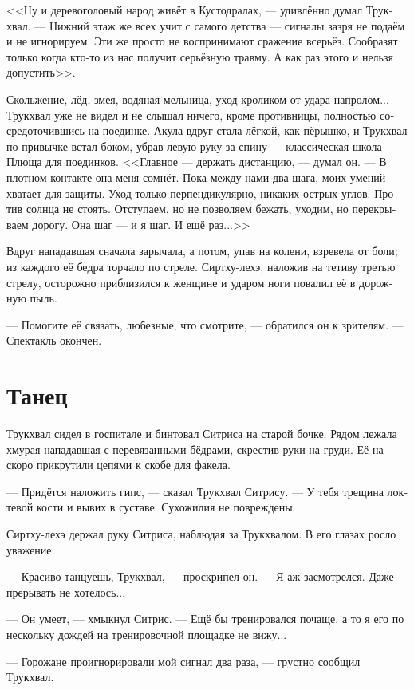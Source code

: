 \documentclass[a4paper,12pt,fleqn]{book}\usepackage{cooltooltips}\usepackage{polyglossia}\setdefaultlanguage{russian}\setotherlanguage{english}\defaultfontfeatures{Ligatures=TeX,Mapping=tex-text} \usepackage{xcolor}\definecolor{lightgray}{HTML}{bbbbbb}\color{lightgray}\newcommand{\ml}[3]{\textenglish{\textcolor{black}{#3}}}
\begin{document}
<<Ну и деревоголовый народ живёт в Кустодралах, --- удивлённо думал Трукхвал.
--- Нижний этаж же всех учит с самого детства --- сигналы зазря не подаём и не игнорируем.
Эти же просто не воспринимают сражение всерьёз.
Сообразят только когда кто-то из нас получит серьёзную травму.
А как раз этого и нельзя допустить>>.

Скольжение, лёд, змея, водяная мельница, уход кроликом от удара напролом...
Трукхвал уже не видел и не слышал ничего, кроме противницы, полностью сосредоточившись на поединке.
Акула вдруг стала лёгкой, как пёрышко, и Трукхвал по привычке встал боком, убрав левую руку за спину --- классическая школа Плюща для поединков.
<<Главное --- держать дистанцию, --- думал он.
--- В плотном контакте она меня сомнёт.
Пока между нами два шага, моих умений хватает для защиты.
Уход только перпендикулярно, никаких острых углов.
Против солнца не стоять.
Отступаем, но не позволяем бежать, уходим, но перекрываем дорогу.
Она шаг --- и я шаг.
И ещё раз...>>

Вдруг нападавшая сначала зарычала, а потом, упав на колени, взревела от боли;
из каждого её бедра торчало по стреле.
Сиртху-лехэ, наложив на тетиву третью стрелу, осторожно приблизился к женщине и ударом ноги повалил её в дорожную пыль.

--- Помогите её связать, любезные, что смотрите, --- обратился он к зрителям.
--- Спектакль окончен.

\section{Танец}

Трукхвал сидел в госпитале и бинтовал Ситриса на старой бочке.
Рядом лежала хмурая нападавшая с перевязанными бёдрами, скрестив руки на груди.
Её наскоро прикрутили цепями к скобе для факела.

--- Придётся наложить гипс, --- сказал Трукхвал Ситрису.
--- У тебя трещина локтевой кости и вывих в суставе.
Сухожилия не повреждены.

Сиртху-лехэ держал руку Ситриса, наблюдая за Трукхвалом.
В его глазах росло уважение.

--- Красиво танцуешь, Трукхвал, --- проскрипел он.
--- Я аж засмотрелся.
Даже прерывать не хотелось...

--- Он умеет, --- хмыкнул Ситрис.
--- Ещё бы тренировался почаще, а то я его по нескольку дождей на тренировочной площадке не вижу...

--- Горожане проигнорировали мой сигнал два раза, --- грустно сообщил Трукхвал.
\end{document}
